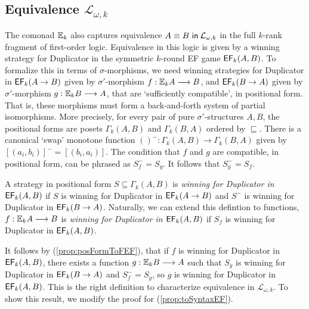 \subsection{Equivalence $\mathcal{L}_{\omega,k}$}
The comonad ${\mathbb{E}_{k}}$ also captures equivalence ${A \equiv B \ \mathsf{in}\: \mathcal{L}_{\omega,k}}$ in the full $k$-rank fragment of first-order logic. Equivalence in this logic is given by a winning strategy for Duplicator in the symmetric $k$-round EF game ${\mathsf{EF}_{k}(A,B)}$. To formalize this in terms of $\sigma$-morphisms, we need winning strategies for Duplicator in ${\mathsf{EF}_{k}(A \rightarrow B)}$ given by $\sigma'$-morphism $f:{\mathbb{E}_{k}A} \longrightarrow B$, and ${\mathsf{EF}_{k}(B \rightarrow A)}$ given by $\sigma'$-morphism $g:{\mathbb{E}_{k}B} \longrightarrow A$, that are `sufficiently compatible', in positional form.  That is, these morphisms must form a back-and-forth system of partial isomorphisms. More precisely, for every pair of pure $\sigma'$-structures $A,B$, the positional forms are posets $\Gamma_{k}(A,B)$ and $\Gamma_{k}(B,A)$ ordered by $\sqsubseteq$. There is a canonical `swap' monotone function $()^{-}:\Gamma_{k}(A,B) \longrightarrow \Gamma_{k}(B,A)$ given by $[(a_{i},b_{i})]^{-} = [(b_{i},a_{i})]$. The condition that $f$ and $g$ are compatible, in positional form, can be phrased as $S_{f}^{-} = S_{g}$. It follows that $S_{g}^{-} = S_{f}$. 
\begin{defn}
A strategy in positional form $S \subseteq \Gamma_{k}(A,B)$ is \textit{winning for Duplicator in ${\mathsf{EF}_{k}(A,B)}$} if $S$ is winning for Duplicator in ${\mathsf{EF}_{k}(A \rightarrow B)}$ and $S^{-}$ is winning for Duplicator in ${\mathsf{EF}_{k}(B \rightarrow A)}$. Naturally, we can extend this defintion to functions, $f:{\mathbb{E}_{k}A} \longrightarrow B$ is \textit{winning for Duplicator in ${\mathsf{EF}_{k}(A,B)}$} if $S_{f}$ is winning for Duplicator in ${\mathsf{EF}_{k}(A,B)}$.
\end{defn}
It follows by (\ref{prop:posFormToFEF}), that if $f$ is winning for Duplicator in ${\mathsf{EF}_{k}(A,B)}$, there exists a function $g:{\mathbb{E}_{k}B} \longrightarrow A$ such that $S_{g}$ is winning for Duplicator in ${\mathsf{EF}_{k}(B \rightarrow A)}$ and $S_{f}^{-} = S_{g}$, so $g$ is winning for Duplicator in ${\mathsf{EF}_{k}(A,B)}$. This is the right definition to characterize equivalence in $\mathcal{L}_{\omega,k}$. To show this result, we modify the proof for (\ref{prop:toSyntaxEF}).  
